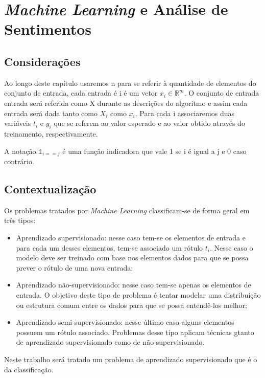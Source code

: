\chapter{\textit{Machine Learning} e Análise de Sentimentos}

\section{Considerações}
\label{sec:considerations}

Ao longo deste capítulo usaremos n para se referir à quantidade de elementos
do conjunto de entrada, cada entrada é i é um vetor $x_i \in \mathbb{R}^m$.
O conjunto de entrada entrada será referida como X
 durante as descrições do algoritmo e assim cada entrada será 
dada tanto como $X_i$ como $x_i$.
Para cada i associaremos duas variáveis $t_i$ e $y_i$ que se referem ao valor
esperado e ao valor obtido através do treinamento, respectivamente.

A notação $\mathds{1}_{i == j}$ é uma função indicadora que vale 1 se i é
igual a j e 0 caso contrário.

\section{Contextualização}
\label{sec:methods}

Os problemas tratados por \textit{Machine Learning} classificam-se de forma
geral em três tipos:

\begin{itemize}
	\item Aprendizado supervisionado: nesse caso tem-se os elementos de entrada e
	para cada um desses elementos, tem-se associado um rótulo $t_i$. Nesse caso o modelo
	deve ser treinado com base nos elementos dados para que se possa prever o rótulo %
	de uma nova entrada;
	\item Aprendizado não-supervisionado: nesse caso tem-se apenas os elementos de entrada. 
	O objetivo deste tipo de problema é tentar modelar uma distribuição ou estrutura comum
	entre os dados para que se possa entendê-los melhor;
	\item Aprendizado semi-supervisionado: nesse último caso alguns elementos possuem um rótulo
	associado. Problemas desse tipo aplicam técnicas gtanto de aprendizado supervisionado como
	de não-supervisionado.
\end{itemize}

Neste trabalho será tratado um problema de aprendizado supervisionado que é o da classificação.


